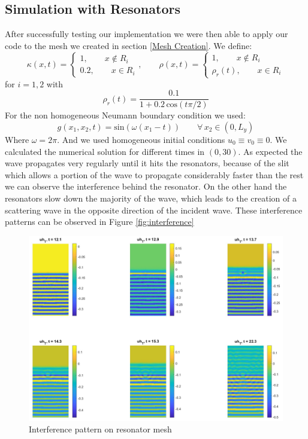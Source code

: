 \documentclass{article}
\begin{document}
\subsection{Simulation with Resonators}
After successfully testing our implementation we were then able to apply our code to the mesh we created in section \ref{Mesh Creation}. We define:
\begin{equation*}
\kappa(x,t) = 
\left\{
\begin{aligned}
1, \qquad x\notin R_i \\
0.2, \qquad x \in R_i
\end{aligned}
\right. ,\qquad
\rho(x,t) = 
\left\{
\begin{aligned}
1, \qquad x\notin R_i \\
\rho_r(t), \qquad x \in R_i
\end{aligned}
\right.
\end{equation*}
for $i = 1,2$ with 
\[
	\rho_r(t) = \frac{0.1}{1 + 0.2\, \text{cos}(t\pi/2)}
\]
For the non homogeneous Neumann boundary condition we used: 
\[
	g(x_1,x_2,t) = \text{sin}(\omega(x_1-t)) \qquad \forall\, x_2 
	\in (0,L_y)
\]
Where $\omega = 2\pi$. And we used homogeneous initial conditions
$u_0 \equiv v_0 \equiv 0$. We calculated the numerical solution for different times in $(0,30)$. As expected the wave propagates very regularly until it hits the resonators, because of the slit which allows a portion of the wave to propagate considerably faster than the rest we can observe the interference behind the resonator. On the other hand the resonators slow down the majority of the wave, which leads to the creation of a scattering wave in the opposite direction of the incident wave. These interference patterns can be observed in Figure \eqref{fig:interference}

\begin{figure}
\center
\includegraphics[width=1.05\linewidth]{interferenceBig.jpg}
\caption{Interference pattern on resonator mesh}
\label{fig:interference}
\end{figure}
\end{document}
